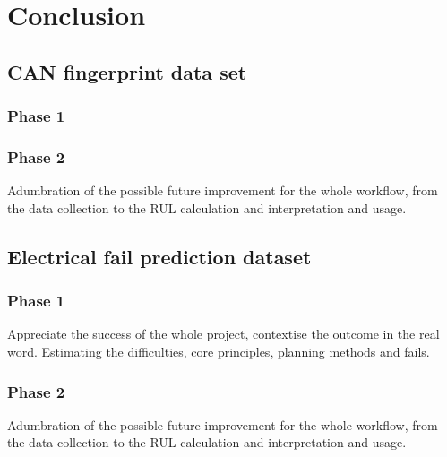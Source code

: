 \chapter{Conclusion}
\section{CAN fingerprint data set}
\subsection{Phase 1}





\subsection{Phase 2}
Adumbration of the possible future improvement for the whole workflow, from the data collection to the RUL calculation and interpretation and usage.
\section{Electrical fail prediction dataset}
\subsection{Phase 1}
Appreciate the success of the whole project, contextise the outcome in the real word. Estimating the difficulties, core principles, planning methods and fails.

\subsection{Phase 2}
Adumbration of the possible future improvement for the whole workflow, from the data collection to the RUL calculation and interpretation and usage.
